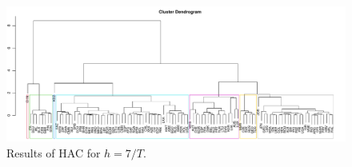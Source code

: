 \documentclass[a4paper,12pt]{article}
\numberwithin{equation}{section}
\begin{document}
\newpage 
\FloatBarrier
\begin{figure}
\includegraphics[width=\textwidth]{plots/14days/dendrogram}
\caption{Results of HAC for $h = 7/T$.}\label{fig:dend_14days}
\end{figure}
\end{document}
